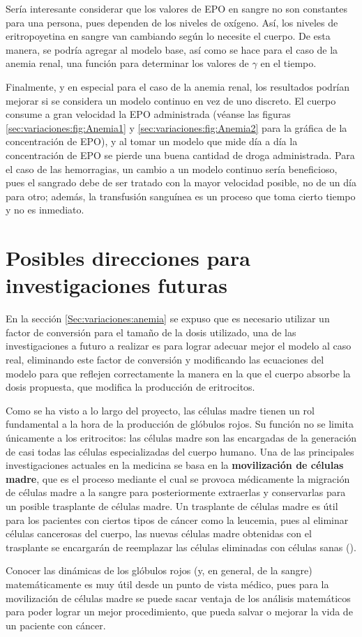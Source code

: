 Sería interesante considerar que los valores de EPO en sangre no son constantes para una persona, pues dependen de los niveles de oxígeno. Así, los niveles de eritropoyetina en sangre van cambiando según lo necesite el cuerpo. De esta manera, se podría agregar al modelo base, así como se hace para el caso de la anemia renal, una función para determinar los valores de $\gamma$ en el tiempo.

Finalmente, y en especial para el caso de la anemia renal, los resultados podrían mejorar si se considera un modelo continuo en vez de uno discreto. El cuerpo consume a gran velocidad la EPO administrada (véanse las figuras \ref{sec:variaciones:fig:Anemia1} y \ref{sec:variaciones:fig:Anemia2} para la gráfica de la concentración de EPO), y al tomar un modelo que mide día a día la concentración de EPO se pierde una buena cantidad de droga administrada. Para el caso de las hemorragias, un cambio a un modelo continuo sería beneficioso, pues el sangrado debe de ser tratado con la mayor velocidad posible, no de un día para otro; además, la transfusión sanguínea es un proceso que toma cierto tiempo y no es inmediato. 

\section{Posibles direcciones para investigaciones futuras}

En la sección \ref{Sec:variaciones:anemia} se expuso que es necesario utilizar un factor de conversión para el tamaño de la dosis utilizado, una de las investigaciones a futuro a realizar es para lograr adecuar mejor el modelo al caso real, eliminando este factor de conversión y modificando las ecuaciones del modelo para que reflejen correctamente la manera en la que el cuerpo absorbe la dosis propuesta, que modifica la producción de eritrocitos.

Como se ha visto a lo largo del proyecto, las células madre tienen un rol fundamental a la hora de la producción de glóbulos rojos. Su función no se limita únicamente a los eritrocitos: las células madre son las encargadas de la generación de casi todas las células especializadas del cuerpo humano. Una de las principales investigaciones actuales en la medicina se basa en la \textbf{movilización de células madre}, que es el proceso mediante el cual se provoca médicamente la migración de células madre a la sangre para posteriormente extraerlas y conservarlas para un posible trasplante de células madre. Un trasplante de células madre es útil para los pacientes con ciertos tipos de cáncer como la leucemia, pues al eliminar células cancerosas del cuerpo, las nuevas células madre obtenidas con el trasplante se encargarán de reemplazar las células eliminadas con células sanas (\cite{Trasplante}).  

Conocer las dinámicas de los glóbulos rojos (y, en general, de la sangre) matemáticamente es muy útil desde un punto de vista médico, pues para la movilización de células madre se puede sacar ventaja de los análisis matemáticos para poder lograr un mejor procedimiento, que pueda salvar o mejorar la vida de un paciente con cáncer.
